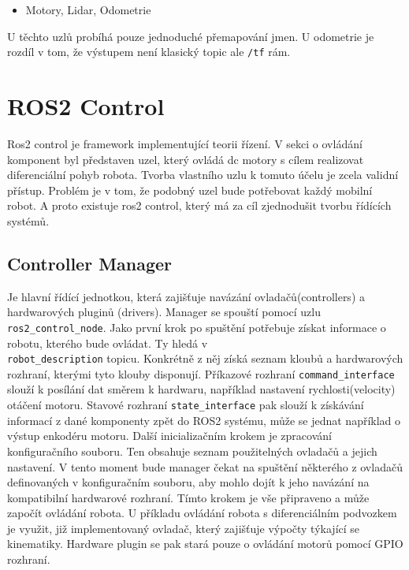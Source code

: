 \begin{itemize}[leftmargin=*]
	\item{Motory, Lidar, Odometrie}
\end{itemize}
\vspace*{-0.5em}
U těchto uzlů probíhá pouze jednoduché přemapování jmen. U odometrie je rozdíl v tom, že výstupem není klasický topic ale \verb|/tf| rám.

\section{ROS2 Control}
Ros2 control je framework implementující teorii řízení. V sekci o ovládání komponent byl představen uzel, který ovládá dc motory s cílem realizovat diferenciální pohyb robota. Tvorba vlastního uzlu k tomuto účelu je zcela validní přístup. Problém je v tom, že podobný uzel bude potřebovat každý mobilní robot. A proto existuje ros2 control, který má za cíl zjednodušit tvorbu řídících systémů.

\subsection*{Controller Manager}
Je hlavní řídící jednotkou, která zajišťuje navázání ovladačů(controllers) a hardwarových pluginů (drivers). Manager se spouští pomocí uzlu \verb|ros2_control_node|. Jako první krok po spuštění potřebuje získat informace o robotu, kterého bude ovládat. Ty hledá v \\ \verb|robot_description| topicu. Konkrétně z něj získá seznam kloubů a hardwarových rozhraní, kterými tyto klouby disponují. Příkazové rozhraní \verb|command_interface| slouží k posílání dat směrem k hardwaru, například nastavení rychlosti(velocity) otáčení motoru. Stavové rozhraní \verb|state_interface| pak slouží k získávání informací z dané komponenty zpět do ROS2 systému, může se jednat například o výstup enkodéru motoru. Další inicializačním krokem je zpracování konfiguračního souboru. Ten obsahuje seznam použitelných ovladačů a jejich nastavení. V tento moment bude manager čekat na spuštění některého z ovladačů definovaných v konfiguračním souboru, aby mohlo dojít k jeho navázání na kompatibilní hardwarové rozhraní. Tímto krokem je vše připraveno a může započít ovládání robota.
U příkladu ovládání robota s diferenciálním podvozkem je využit, již implementovaný ovladač, který zajišťuje výpočty týkající se kinematiky. Hardware plugin se pak stará pouze o ovládání motorů pomocí GPIO rozhraní.

